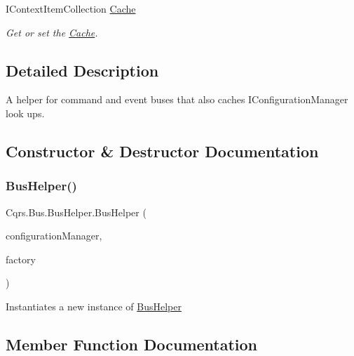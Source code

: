 \begin{DoxyCompactItemize}
I\+Context\+Item\+Collection \hyperlink{classCqrs_1_1Bus_1_1BusHelper_aa4cbe005c60386ba143fe84afe53d694_aa4cbe005c60386ba143fe84afe53d694}{Cache}
\begin{DoxyCompactList}\small\item\em Get or set the \hyperlink{namespaceCqrs_1_1Cache}{Cache}. \end{DoxyCompactList}\end{DoxyCompactItemize}


\subsection{Detailed Description}
A helper for command and event buses that also caches I\+Configuration\+Manager look ups. 



\subsection{Constructor \& Destructor Documentation}
\mbox{\label{classCqrs_1_1Bus_1_1BusHelper_aa5efb509877057c06b8843e34a8c4dd2_aa5efb509877057c06b8843e34a8c4dd2}} 
\subsubsection{\texorpdfstring{Bus\+Helper()}{BusHelper()}}
{\footnotesize\ttfamily Cqrs.\+Bus.\+Bus\+Helper.\+Bus\+Helper (\begin{DoxyParamCaption}\item[{\hyperlink{interfaceCqrs_1_1Configuration_1_1IConfigurationManager}{I\+Configuration\+Manager}}]{configuration\+Manager,  }\item[{I\+Context\+Item\+Collection\+Factory}]{factory }\end{DoxyParamCaption})}



Instantiates a new instance of \hyperlink{classCqrs_1_1Bus_1_1BusHelper}{Bus\+Helper} 



\subsection{Member Function Documentation}
\mbox{\label{classCqrs_1_1Bus_1_1BusHelper_a6dc1f5166b7bcd13aa7a0d5e25ded295_a6dc1f5166b7bcd13aa7a0d5e25ded295}} 
